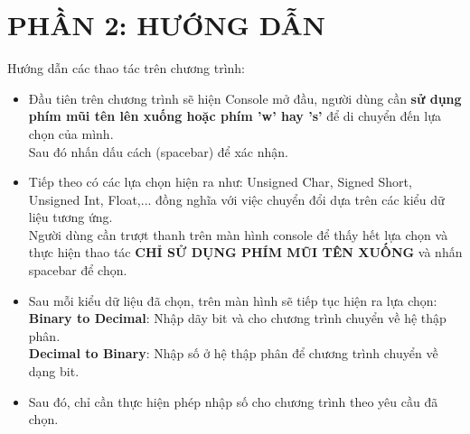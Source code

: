 \documentclass[12pt,a4paper]{article}
\begin{document}
\section{\textbf{\color{red}PHẦN 2: HƯỚNG DẪN}}
\large Hướng dẫn các thao tác trên chương trình:
\begin{itemize}
    \item  \Large Đầu tiên trên chương trình sẽ hiện Console mở đầu, người dùng cần \textbf{sử dụng phím mũi tên lên xuống hoặc phím 'w' hay 's'} để di chuyển đến lựa chọn của mình. \\
    \Large Sau đó nhấn dấu cách (spacebar) để xác nhận. \\
    \item  \Large Tiếp theo có các lựa chọn hiện ra như: Unsigned Char, Signed Short, Unsigned Int, Float,... đồng nghĩa với việc chuyển đổi dựa trên các kiểu dữ liệu tương ứng. \\
    \Large Người dùng cần trượt thanh trên màn hình console để thấy hết lựa chọn và thực hiện thao tác  \color{red}\textbf{CHỈ SỬ DỤNG PHÍM MŨI TÊN XUỐNG }\color{black} và nhấn spacebar để chọn. \\
    \item  \Large Sau mỗi kiểu dữ liệu đã chọn, trên màn hình sẽ tiếp tục hiện ra lựa chọn: \\
    \Large \textbf{Binary to Decimal}: Nhập dãy bit và cho chương trình chuyển về hệ thập phân. \\
    \Large \textbf{Decimal to Binary}: Nhập số ở hệ thập phân để chương trình chuyển về dạng bit. \\
    \item  \Large Sau đó, chỉ cần thực hiện phép nhập số cho chương trình theo yêu cầu đã chọn. \\
\end{itemize}
\newpage
\end{document}
